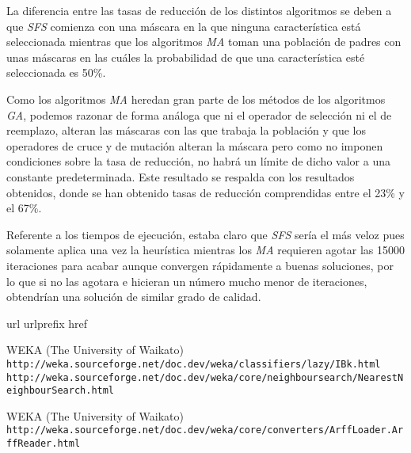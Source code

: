 \documentclass[a4paper, 11pt]{article}
\begin{document}
			La diferencia entre las tasas de reducción de los distintos algoritmos se deben a que \textit{SFS}
			comienza con una máscara en la que ninguna característica está seleccionada mientras que
			los algoritmos \textit{MA} toman una población de padres con unas máscaras en las cuáles
			la probabilidad de que una característica esté seleccionada es 50\%.
			
			Como los algoritmos \textit{MA} heredan gran parte de los métodos de los algoritmos \textit{GA},
			podemos razonar de forma análoga que ni el operador de selección ni el de reemplazo, alteran
			las máscaras con las que trabaja la población y que los operadores de cruce y de mutación
			alteran la máscara pero como no imponen condiciones sobre la tasa de reducción, no habrá
			un límite de dicho valor a una constante predeterminada. Este resultado se respalda con los
			resultados obtenidos, donde se han obtenido tasas de reducción comprendidas entre el 23\% y
			el 67\%.
			
			Referente a los tiempos de ejecución, estaba claro que \textit{SFS} sería el más veloz pues
			solamente aplica una vez la heurística mientras los \textit{MA} requieren agotar las 15000
			iteraciones para acabar aunque convergen rápidamente a buenas soluciones, por lo que si no
			las agotara e hicieran un número mucho menor de iteraciones, obtendrían una solución de
			similar grado de calidad.
			
	
	\newpage
	
	\begin{thebibliography}{10}
	\expandafter\ifx\csname url\endcsname\relax
	  \def\url#1{\texttt{#1}}\fi
	\expandafter\ifx\csname urlprefix\endcsname\relax\def\urlprefix{URL }\fi
	\expandafter\ifx\csname href\endcsname\relax
	  \def\href#1#2{#2} \def\path#1{#1}\fi
	
	WEKA (The University of Waikato)\\
	  \url{http://weka.sourceforge.net/doc.dev/weka/classifiers/lazy/IBk.html}\\
	  \url{http://weka.sourceforge.net/doc.dev/weka/core/neighboursearch/NearestNeighbourSearch.html}
	  
  	WEKA (The University of Waikato)\\
	  \url{http://weka.sourceforge.net/doc.dev/weka/core/converters/ArffLoader.ArffReader.html}
	  
	\end{thebibliography}
\end{document}
